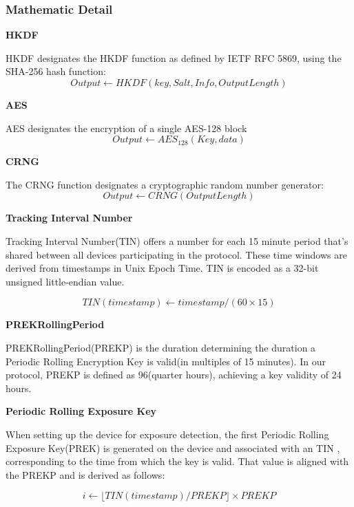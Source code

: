 \documentclass[11pt,en]{elegantpaper}
\begin{document}
\subsubsection{Mathematic Detail}




\textbf{HKDF}

HKDF \cite{briefxip3322b}designates the HKDF function as defined by IETF RFC 5869, using the SHA-256 hash function: 
$$Output\leftarrow HKDF(key,Salt, Info, OutputLength)$$

\textbf{AES}

AES \cite{gueron2020flexible}designates the encryption of a single AES-128 block
$$Output\leftarrow AES_{128}(Key,data)$$

\textbf{CRNG}

The CRNG \cite{datcu2020chaos}function designates a cryptographic random number generator: 
$$Output\leftarrow CRNG(OutputLength)$$

\textbf{Tracking Interval Number}

Tracking Interval Number(TIN) offers a number for each 15 minute period that’s shared between all devices participating in the protocol. These time windows are derived from timestamps in Unix Epoch Time. TIN is encoded as a 32-bit unsigned little-endian value.

$$TIN(timestamp)\leftarrow timestamp/(60\times 15)$$

\textbf{PREKRollingPeriod}

PREKRollingPeriod(PREKP) is the duration determining the duration a Periodic Rolling Encryption Key is valid(in multiples of 15 minutes). In our protocol, PREKP is defined as 96(quarter hours), achieving a key validity of 24 hours. 

\textbf{Periodic Rolling Exposure Key}

When setting up the device for exposure detection, the first Periodic Rolling Exposure Key(PREK) is generated on the device and associated with an TIN , corresponding to the time from which the
key is valid. That value is aligned with the PREKP and is derived as follows: 

$$i\leftarrow \lfloor TIN(timestamp)/PREKP\rfloor \times PREKP$$
\end{document}
